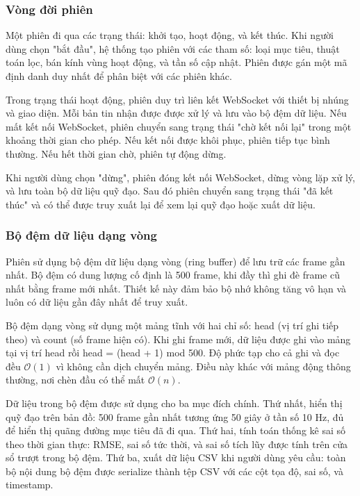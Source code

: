 \subsubsection{Vòng đời phiên}

\hspace{0.5cm} Một phiên đi qua các trạng thái: khởi tạo, hoạt động, và kết thúc. Khi người dùng chọn "bắt đầu", hệ thống tạo phiên với các tham số: loại mục tiêu, thuật toán lọc, bán kính vùng hoạt động, và tần số cập nhật. Phiên được gán một mã định danh duy nhất để phân biệt với các phiên khác.

Trong trạng thái hoạt động, phiên duy trì liên kết WebSocket với thiết bị nhúng và giao diện. Mỗi bản tin nhận được được xử lý và lưu vào bộ đệm dữ liệu. Nếu mất kết nối WebSocket, phiên chuyển sang trạng thái "chờ kết nối lại" trong một khoảng thời gian cho phép. Nếu kết nối được khôi phục, phiên tiếp tục bình thường. Nếu hết thời gian chờ, phiên tự động dừng.

Khi người dùng chọn "dừng", phiên đóng kết nối WebSocket, dừng vòng lặp xử lý, và lưu toàn bộ dữ liệu quỹ đạo. Sau đó phiên chuyển sang trạng thái "đã kết thúc" và có thể được truy xuất lại để xem lại quỹ đạo hoặc xuất dữ liệu.

\subsubsection{Bộ đệm dữ liệu dạng vòng}

\hspace{0.5cm} Phiên sử dụng bộ đệm dữ liệu dạng vòng (ring buffer) để lưu trữ các frame gần nhất. Bộ đệm có dung lượng cố định là 500 frame, khi đầy thì ghi đè frame cũ nhất bằng frame mới nhất. Thiết kế này đảm bảo bộ nhớ không tăng vô hạn và luôn có dữ liệu gần đây nhất để truy xuất.

Bộ đệm dạng vòng sử dụng một mảng tĩnh với hai chỉ số: head (vị trí ghi tiếp theo) và count (số frame hiện có). Khi ghi frame mới, dữ liệu được ghi vào mảng tại vị trí head rồi head = (head + 1) mod 500. Độ phức tạp cho cả ghi và đọc đều $\mathcal{O}(1)$ vì không cần dịch chuyển mảng. Điều này khác với mảng động thông thường, nơi chèn đầu có thể mất $\mathcal{O}(n)$.

Dữ liệu trong bộ đệm được sử dụng cho ba mục đích chính. Thứ nhất, hiển thị quỹ đạo trên bản đồ: 500 frame gần nhất tương ứng 50 giây ở tần số 10 Hz, đủ để hiển thị quãng đường mục tiêu đã đi qua. Thứ hai, tính toán thống kê sai số theo thời gian thực: RMSE, sai số tức thời, và sai số tích lũy được tính trên cửa sổ trượt trong bộ đệm. Thứ ba, xuất dữ liệu CSV khi người dùng yêu cầu: toàn bộ nội dung bộ đệm được serialize thành tệp CSV với các cột tọa độ, sai số, và timestamp.

